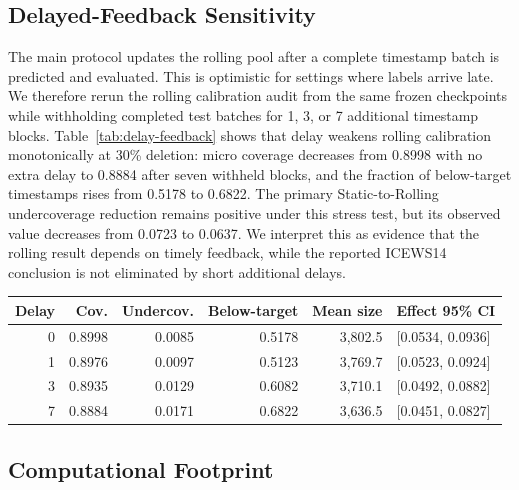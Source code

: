 \documentclass[information,article,submit,oneauthor,pdftex]{Definitions/mdpi}
\begin{document}
\subsection{Delayed-Feedback Sensitivity}

The main protocol updates the rolling pool after a complete timestamp batch is
predicted and evaluated. This is optimistic for settings where labels arrive
late. We therefore rerun the rolling calibration audit from the same frozen
checkpoints while withholding completed test batches for 1, 3, or 7 additional
timestamp blocks. Table~\ref{tab:delay-feedback} shows that delay weakens
rolling calibration monotonically at 30\% deletion: micro coverage decreases
from 0.8998 with no extra delay to 0.8884 after seven withheld blocks, and the
fraction of below-target timestamps rises from 0.5178 to 0.6822. The primary
Static-to-Rolling undercoverage reduction remains positive under this stress
test, but its observed value decreases from 0.0723 to 0.0637. We interpret this
as evidence that the rolling result depends on timely feedback, while the
reported ICEWS14 conclusion is not eliminated by short additional delays.

\begin{center}
\captionsetup{type=table}
\centering
{}
\label{tab:delay-feedback}
\scriptsize
\setlength{\tabcolsep}{2pt}
\begin{tabular}{@{}rrrrrl@{}}
\toprule
Delay & Cov. & Undercov. & Below-target & Mean size & Effect 95\% CI\\
\midrule
0 & 0.8998 & 0.0085 & 0.5178 & 3,802.5 & [0.0534, 0.0936]\\
1 & 0.8976 & 0.0097 & 0.5123 & 3,769.7 & [0.0523, 0.0924]\\
3 & 0.8935 & 0.0129 & 0.6082 & 3,710.1 & [0.0492, 0.0882]\\
7 & 0.8884 & 0.0171 & 0.6822 & 3,636.5 & [0.0451, 0.0827]\\
\bottomrule
\end{tabular}
\end{center}

\subsection{Computational Footprint}
\end{document}
